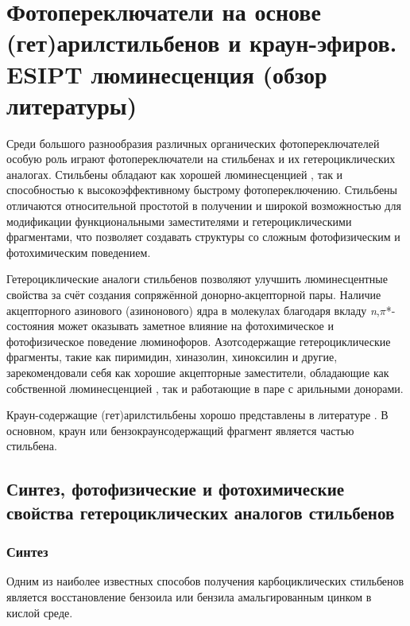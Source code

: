 \chapter{Фотопереключатели на основе (гет)арилстильбенов и краун-эфиров. ESIPT люминесценция (обзор литературы)} \label{chapt1}

	Среди большого разнообразия различных органических фотопереключателей особую роль играют фотопереключатели на стильбенах и их гетероциклических аналогах. Стильбены обладают как хорошей люминесценцией \cite{Krasovitsky_Bolotin}, так и способностью к высокоэффективному быстрому фотопереключению. Стильбены отличаются относительной простотой в получении \cite{Wood1941} и широкой возможностью для модификации функциональными заместителями и гетероциклическими фрагментами, что позволяет создавать структуры со сложным фотофизическим и фотохимическим поведением. \cite{Waldeck_D_H1991_Stilbenes} 
	
	Гетероциклические аналоги стильбенов позволяют улучшить люминесцентные свойства за счёт создания сопряжённой донорно-акцепторной пары. Наличие акцепторного азинового (азинонового) ядра в молекулах благодаря вкладу \textit{n},$\pi$*-состояния может оказывать заметное влияние на фотохимическое и фотофизическое поведение люминофоров. \cite{Lower1966} Азотсодержащие гетероциклические фрагменты, такие как пиримидин, хиназолин, хиноксилин и другие, зарекомендовали себя как хорошие акцепторные заместители, обладающие как собственной люминесценцией \cite{Krasovitsky_Bolotin}, так и работающие в паре с арильными донорами.
	
	Краун-содержащие (гет)арилстильбены хорошо представлены в литературе \cite{Gromov_2006_Crowns_in_Stilbenes}. В основном, краун или бензокраунсодержащий фрагмент является частью стильбена. 

	\section{Синтез, фотофизические и фотохимические свойства гетероциклических аналогов стильбенов}\label{sect1_1}
	
		\subsection{Синтез}
	
			Одним из наиболее известных способов получения карбоциклических стильбенов является восстановление бензоила или бензила амальгированным цинком в кислой среде. \cite{Krasovitsky_Bolotin} 
			
